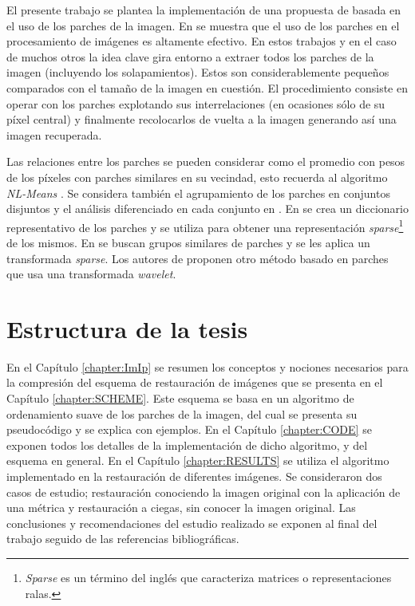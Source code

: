 El presente trabajo se plantea la implementaci\'on de una propuesta de \II basada en el uso de los parches de la imagen. En \cite{buades2005review,chatterjee2009clustering,yu2010image,yu2011solving,dong2011image,dong2011sparsity,zoran2011learning,elad2006image,mairal2007sparse,mairal2009non,zeyde2010single,dabov2007image,li2008patch} se muestra que el uso de los parches en el procesamiento de im\'agenes es altamente efectivo. En estos trabajos y en el caso de muchos otros la idea clave gira entorno a extraer todos los parches de la imagen (incluyendo los solapamientos). Estos son considerablemente pequeños comparados con el tamaño de la imagen en cuesti\'on. El procedimiento consiste en operar con los parches explotando sus interrelaciones (en ocasiones s\'olo de su p\'ixel central) y finalmente recolocarlos de vuelta a la imagen generando as\'i una imagen recuperada.

Las relaciones entre los parches se pueden considerar como el promedio con pesos de los p\'ixeles con parches similares en su vecindad, esto recuerda al algoritmo \textit{NL-Means} \cite{buades2005review}. Se considera tambi\'en el agrupamiento de los parches en conjuntos disjuntos y el análisis diferenciado en cada conjunto en \cite{chatterjee2009clustering,yu2010image,yu2011solving,dong2011image,dong2011sparsity,zoran2011learning}. En \cite{elad2006image,mairal2007sparse,mairal2009non,zeyde2010single} se crea un diccionario representativo de los parches y se utiliza para obtener una representaci\'on \textit{sparse}\footnote{\textit{Sparse} es un término del inglés que caracteriza matrices o representaciones ralas.} de los mismos. En \cite{mairal2009non,dabov2007image,li2008patch} se buscan grupos similares de parches y se les aplica un transformada \textit{sparse}. Los autores de \cite{ram2011generalized,ram2012redundant} proponen otro m\'etodo basado en parches que usa una transformada \textit{wavelet}.

\section*{Estructura de la tesis}

En el Cap\'itulo \ref{chapter:ImIp} se resumen los conceptos y nociones necesarios para la compresi\'on del esquema de restauraci\'on de im\'agenes que se presenta en el Cap\'itulo \ref{chapter:SCHEME}. Este esquema se basa en un algoritmo de ordenamiento suave de los parches de la imagen, del cual se presenta su pseudoc\'odigo y se explica con ejemplos. En el Cap\'itulo \ref{chapter:CODE} se exponen todos los detalles de la implementaci\'on de dicho algoritmo, y del esquema en general. En el Cap\'itulo \ref{chapter:RESULTS} se utiliza el algoritmo implementado en la restauración de diferentes imágenes. Se consideraron dos casos de estudio; restauración conociendo la imagen original con la aplicación de una métrica y restauración a ciegas, sin conocer la imagen original. Las conclusiones y recomendaciones del estudio realizado se exponen al final del trabajo seguido de las referencias bibliográficas.
